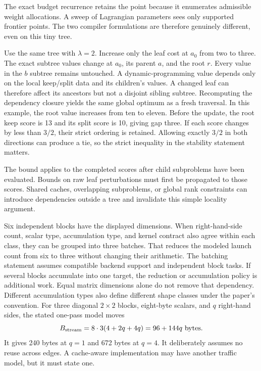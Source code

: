 The exact budget recurrence retains the point because it enumerates admissible weight allocations. A sweep of Lagrangian parameters sees only supported frontier points. The two compiler formulations are therefore genuinely different, even on this tiny tree.

Use the same tree with $\lambda=2$. Increase only the leaf cost at $a_0$ from two to three. The exact subtree values change at $a_0$, its parent $a$, and the root $r$. Every value in the $b$ subtree remains untouched.
A dynamic-programming value depends only on the local keep/split data and its children's values. A changed leaf can therefore affect its ancestors but not a disjoint sibling subtree. Recomputing the dependency closure yields the same global optimum as a fresh traversal. In this example, the root value increases from ten to eleven.
Before the update, the root keep score is 13 and its split score is 10, giving gap three. If each score changes by less than $3/2$, their strict ordering is retained. Allowing exactly $3/2$ in both directions can produce a tie, so the strict inequality in the stability statement matters.

The bound applies to the completed scores after child subproblems have been evaluated. Bounds on raw leaf perturbations must first be propagated to those scores. Shared caches, overlapping subproblems, or global rank constraints can introduce dependencies outside a tree and invalidate this simple locality argument.

Six independent blocks have the displayed dimensions. When right-hand-side count, scalar type, accumulation type, and kernel contract also agree within each class, they can be grouped into three batches. That reduces the modeled launch count from six to three without changing their arithmetic.
The batching statement assumes compatible backend support and independent block tasks. If several blocks accumulate into one target, the reduction or accumulation policy is additional work. Equal matrix dimensions alone do not remove that dependency. Different accumulation types also define different shape classes under the paper's convention.
For three diagonal $2\times2$ blocks, eight-byte scalars, and $q$ right-hand sides, the stated one-pass model moves
\[
B_{\rm stream}=8\cdot3(4+2q+4q)=96+144q\text{ bytes}.
\]
It gives 240 bytes at $q=1$ and 672 bytes at $q=4$. It deliberately assumes no reuse across edges. A cache-aware implementation may have another traffic model, but it must state one.

